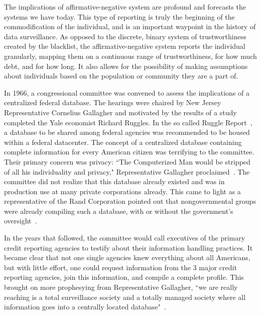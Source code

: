 The implications of affirmative-negative system are profound and forecasts
the systems we have today. This type of reporting is truly the
beginning of the commodification of the individual, and is an important
waypoint in the history of data surveillance. As opposed to the discrete,
binary system of trustworthiness created by the blacklist, the
affirmative-negative system reports the individual granularly, mapping them on
a continuous range of trustworthiness, for how much debt, and for how long. It also
allows for the possibility of making assumptions about individuals based
on the population or community they are a part of.

In 1966, a congressional committee was convened to assess the implications of a
centralized federal database. The hearings were chaired by New Jersey
Representative Cornelius Gallagher and motivated by the results of a study
completed the Yale economist Richard Ruggles. In the so called Ruggle
Report~\cite{ruggles1965report}, a database to be shared among federal agencies
was recommended to be housed within a federal datacenter. The concept of a
centralized database containing complete information for every American citizen
was terrifying to the committee. Their primary concern was privacy: ``The
Computerized Man would be stripped of all his individuality and privacy,"
Representative Gallagher proclaimed~\cite{ruggles1965report}. The committee did
not realize that this database already existed and was in production use at
many private corporations already. This came to light as a representative of
the Rand Corporation pointed out that nongovernmental groups were already
compiling such a database, with or without the government's
oversight~\cite{congress1967privacy}.

In the years that followed, the committee would call executives of the primary
credit reporting agencies to testify about their information handling
practices. It became clear that not one single agencies knew everything about
all Americans, but with little effort, one could request information from the 3
major credit reporting agencies, join this information, and compile a complete
profile. This brought on more prophesying from Representative Gallagher, ``we
are really reaching is a total surveillance society and a totally managed
society where all information goes into a centrally located
database"~\cite{congress1967privacy}.
